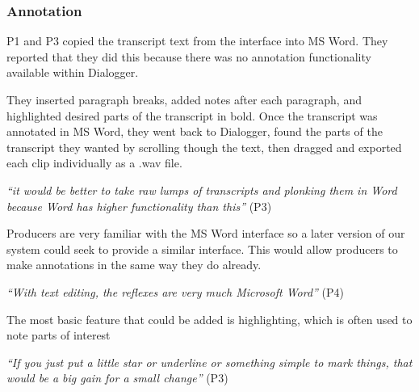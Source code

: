 



\subsubsection{Annotation}


P1 and P3 copied the transcript text from the interface into MS Word. They reported that they did this because there
was no annotation functionality available within Dialogger.

They inserted paragraph breaks, added notes after each paragraph, and highlighted desired parts of the transcript in
bold. Once the transcript was annotated in MS Word, they went back to Dialogger, found the parts of the transcript they
wanted by scrolling though the text, then dragged and exported each clip individually as a .wav file.

\textit{``it would be better to take raw lumps of transcripts and plonking them in Word because Word has higher
  functionality than this''} (P3)

Producers are very familiar with the MS Word interface so a later version of our system could seek to provide a similar
interface. This would allow producers to make annotations in the same way they do already.

\textit{``With text editing, the reflexes are very much Microsoft Word''} (P4)

The most basic feature that could be added is highlighting, which is often used to note parts of interest

\textit{``If you just put a little star or underline or something simple to mark things, that would be a big gain for a
  small change''} (P3)

